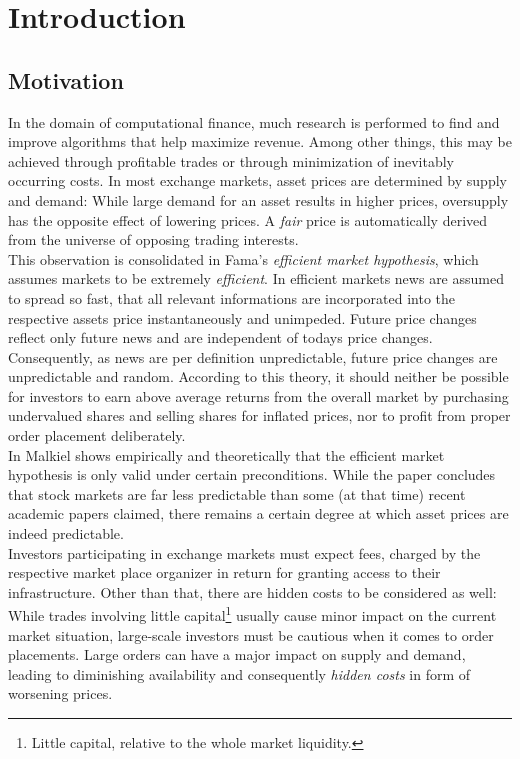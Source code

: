 \chapter{Introduction}
\label{chap:introduction}
\section{Motivation} 
\label{sec:motivation}
In the domain of computational finance, much research is performed to find and improve algorithms that help maximize revenue. Among other things, this may be achieved through profitable trades or through minimization of inevitably occurring costs. In most exchange markets, asset prices are determined by supply and demand: While large demand for an asset results in higher prices, oversupply has the opposite effect of lowering prices. A \emph{fair} price is automatically derived from the universe of opposing trading interests.\\

This observation is consolidated in Fama's \emph{efficient market hypothesis}\Cite{Fama70efficientcapital}, which assumes markets to be extremely \emph{efficient}. In efficient markets news are assumed to spread so fast, that all relevant informations are incorporated into the respective assets price instantaneously and unimpeded. Future price changes reflect only future news and are independent of todays price changes. Consequently, as news are per definition unpredictable, future price changes are unpredictable and random. According to this theory, it should neither be possible for investors to earn above average returns from the overall market by purchasing undervalued shares and selling shares for inflated prices, nor to profit from proper order placement deliberately.\\

In \Cite{TheEfficentMarketHypothesisAndItsCritics} Malkiel shows empirically and theoretically that the efficient market hypothesis is only valid under certain preconditions. While the paper concludes that stock markets are far less predictable than some (at that time) recent academic papers claimed, there remains a certain degree at which asset prices are indeed predictable.\\

Investors participating in exchange markets must expect fees, charged by the respective market place organizer in return for granting access to their infrastructure. Other than that, there are hidden costs to be considered as well: While trades involving little capital\footnote{Little capital, relative to the whole market liquidity.} usually cause minor impact on the current market situation, large-scale investors must be cautious when it comes to order placements. Large orders can have a major impact on supply and demand, leading to diminishing availability and consequently \emph{hidden costs} in form of worsening prices.\\

